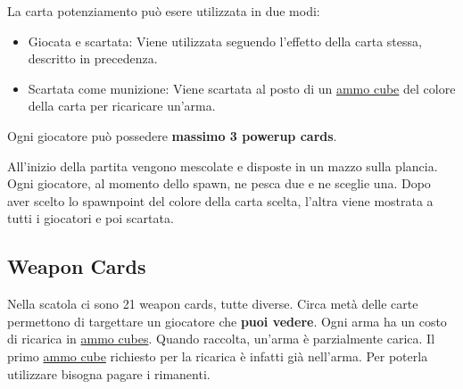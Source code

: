 \documentclass[a4paper, 12pt]{article}
\begin{document}
		La carta potenziamento può esere utilizzata in due modi:
		\begin{itemize}
			\item Giocata e scartata: Viene utilizzata seguendo l'effetto della carta stessa, descritto in precedenza.
			\item Scartata come munizione: Viene scartata al posto di un \hyperref[sec:ammo-cubes]{ammo cube} del colore della carta per ricaricare un'arma. 
		\end{itemize}
		Ogni giocatore può possedere \textbf{massimo 3 powerup cards}.
		
		All'inizio della partita vengono mescolate e disposte in un mazzo sulla plancia.
		Ogni giocatore, al momento dello spawn, ne pesca due e ne sceglie una. 
		Dopo aver scelto lo spawnpoint del colore della carta scelta, l'altra viene mostrata a tutti i giocatori e poi scartata.
		
	\newpage
	
	\subsection{Weapon Cards} \label{sec:weapon-cards}
		Nella scatola ci sono 21 weapon cards, tutte diverse. Circa metà delle carte permettono di targettare un giocatore che \textbf{puoi vedere}.
		Ogni arma ha un costo di ricarica in \hyperref[sec:ammo-cubes]{ammo cubes}.
		Quando raccolta, un'arma è parzialmente carica. Il primo \hyperref[sec:ammo-cubes]{ammo cube} richiesto per la ricarica è infatti già nell'arma. Per poterla utilizzare bisogna pagare i rimanenti.
		
\end{document}
